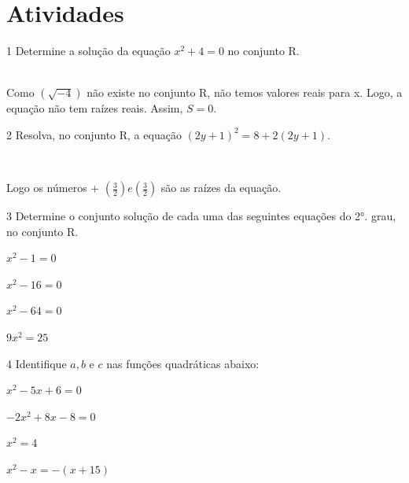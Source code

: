 \section{Atividades}

\num{1} Determine a solução da equação $x^2 + 4 = 0$ no conjunto R.

\\

Como $(\sqrt{- 4})$ não existe no conjunto R, não temos valores reais
para x. Logo, a equação não tem raízes reais. Assim, $S = 0$.

\num{2} Resolva, no conjunto R, a equação $(2y + 1)^2 = 8 + 2(2y + 1)$.

\\

Logo os números + $(\frac{3}{2}) e (\frac{3}{2})$ são as raízes da
equação.

\num{3} Determine o conjunto solução de cada uma das seguintes equações do
2°. grau, no conjunto R.


\begin{escolha}[itemsep=0pt]
\item $x^2 - 1 = 0$
\item $x^2 - 16 = 0$
\item $x^2 - 64 = 0$
\item $9x^2 = 25$
\end{escolha}




\num{4} Identifique $a, b$ e $c$ nas funções quadráticas abaixo:



\begin{escolha}[itemsep=0pt]
\item $x^2 - 5x + 6 = 0$
\item $-2x^2 + 8x - 8 = 0$
\item $x^2 = 4$
\item $x^2 - x = - (x + 15)$
\end{escolha}





